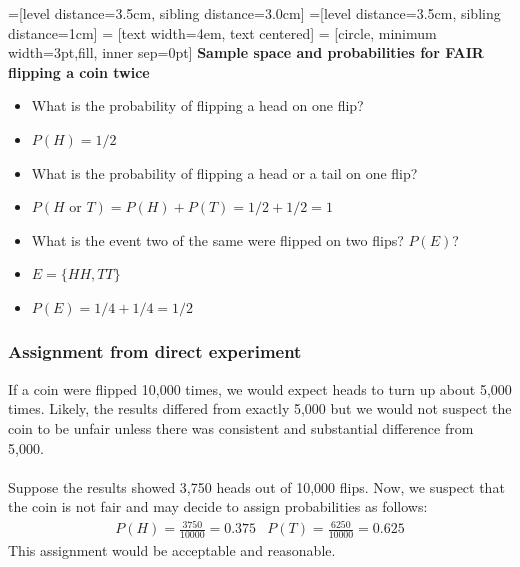 \documentclass[14pt]{extarticle}
\begin{document}
=[level distance=3.5cm, sibling distance=3.0cm]
=[level distance=3.5cm, sibling distance=1cm]
 = [text width=4em, text centered]
 = [circle, minimum width=3pt,fill, inner sep=0pt]
\textbf{Sample space and probabilities for FAIR flipping a coin twice}\\
\begin{itemize}
	\item What is the probability of flipping a head on one flip?
	\item $P(H) = 1/2$
	\item What is the probability of flipping a head or a tail on one flip?
	\item $P(H \text{ or } T) = P(H) + P(T) = 1/2+1/2 = 1$
	\item What is the event two of the same were flipped on two flips? $P(E)$?
	\item $E = \{HH, TT\}$
	\item $P(E) = 1/4 + 1/4 = 1/2$
\end{itemize}

\subsubsection{Assignment from direct experiment}
If a coin were flipped 10,000 times, we would expect heads to turn up about 5,000 times. Likely, the results differed from exactly 5,000 but we would not suspect the coin to be unfair unless there was consistent and substantial difference from 5,000.
\\\\ 
Suppose the results showed 3,750 heads out of 10,000 flips. Now, we suspect that the coin is not fair and may decide to assign probabilities as follows:
\begin{align*}
	&P(H) = \frac{3750}{10000}=0.375 & P(T) = \frac{6250}{10000} =0.625&
\end{align*}
This assignment would be acceptable and reasonable. 
\end{document}
